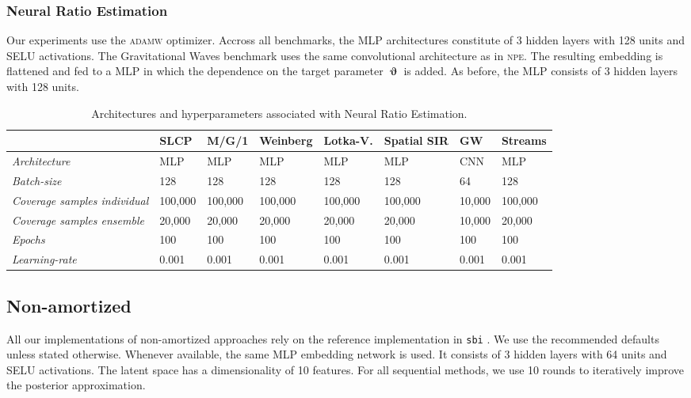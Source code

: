 \documentclass[twoside]{article}
\DeclareMathOperator{\vtheta}{\boldsymbol\vartheta}
\begin{document}
\subsubsection{Neural Ratio Estimation}
Our experiments use the \textsc{adamw} \citep{adam,adamw} optimizer. Accross all benchmarks, the MLP architectures constitute of 3 hidden layers with 128 units and SELU \citep{selu} activations. The Gravitational Waves benchmark uses the same convolutional architecture as in \textsc{npe}. The resulting embedding is flattened and fed to a MLP in which the dependence on the target parameter $\vtheta$ is added. As before, the MLP consists of 3 hidden layers with 128 units.
\begin{table}[h!]
    \centering
    \begin{tabular}{llllllll}
        \toprule
        & SLCP & M/G/1 & Weinberg & Lotka-V. & Spatial SIR & GW & Streams \\
        \midrule
        \emph{Architecture} & MLP & MLP & MLP & MLP & MLP & CNN & MLP \\ 
        \emph{Batch-size} & 128 & 128 & 128 & 128 & 128 & 64 & 128 \\
        \emph{Coverage samples individual} & 100,000 & 100,000 & 100,000 & 100,000 & 100,000 & 10,000 & 100,000 \\
        \emph{Coverage samples ensemble} & 20,000 & 20,000 & 20,000 & 20,000 & 20,000 & 10,000 & 20,000 \\
        \emph{Epochs} & 100 & 100 & 100 & 100 & 100 & 100 & 100 \\
        \emph{Learning-rate} & 0.001 & 0.001 & 0.001 & 0.001 & 0.001 & 0.001 & 0.001 \\
        \bottomrule
    \end{tabular}
    \caption{Architectures and hyperparameters associated with Neural Ratio Estimation.}
    \label{tab:npe_hyperparameters}
\end{table}

\subsection{Non-amortized}
All our implementations of non-amortized approaches rely on the reference implementation in \texttt{sbi} \citep{sbi}. We use the recommended defaults unless stated otherwise. Whenever available, the same MLP embedding network is used. It consists of 3 hidden layers with 64 units and SELU \citep{selu} activations. The latent space has a dimensionality of 10 features. For all sequential methods, we use 10 rounds to iteratively improve the posterior approximation.
\end{document}
